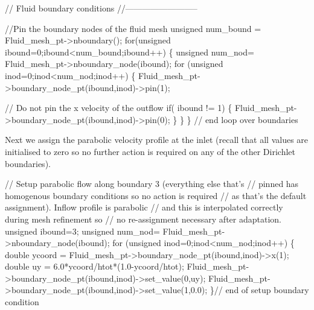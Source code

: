 \begin{DoxyCodeInclude}



 \textcolor{comment}{// Fluid boundary conditions}
 \textcolor{comment}{//--------------------------}

 \textcolor{comment}{//Pin the boundary nodes of the fluid mesh}
 \textcolor{keywordtype}{unsigned} num\_bound = Fluid\_mesh\_pt->nboundary();
 \textcolor{keywordflow}{for}(\textcolor{keywordtype}{unsigned} ibound=0;ibound<num\_bound;ibound++)
  \{
   \textcolor{keywordtype}{unsigned} num\_nod= Fluid\_mesh\_pt->nboundary\_node(ibound);
   \textcolor{keywordflow}{for} (\textcolor{keywordtype}{unsigned} inod=0;inod<num\_nod;inod++)
    \{
      Fluid\_mesh\_pt->boundary\_node\_pt(ibound,inod)->pin(1);
     
      \textcolor{comment}{// Do not pin the x velocity of the outflow}
      \textcolor{keywordflow}{if}( ibound != 1)
      \{
       Fluid\_mesh\_pt->boundary\_node\_pt(ibound,inod)->pin(0); 
      \}      
    \}
  \}
 \textcolor{comment}{// end loop over boundaries}

\end{DoxyCodeInclude}


Next we assign the parabolic velocity profile at the inlet (recall that all values are initialised to zero so no further action is required on any of the other Dirichlet boundaries).


\begin{DoxyCodeInclude}
   

 \textcolor{comment}{// Setup parabolic flow along boundary 3 (everything else that's }
 \textcolor{comment}{// pinned has homogenous boundary conditions so no action is required}
 \textcolor{comment}{// as that's the default assignment). Inflow profile is parabolic}
 \textcolor{comment}{// and this is interpolated correctly during mesh refinement so}
 \textcolor{comment}{// no re-assignment necessary after adaptation.}
 \textcolor{keywordtype}{unsigned} ibound=3; 
 \textcolor{keywordtype}{unsigned} num\_nod= Fluid\_mesh\_pt->nboundary\_node(ibound);
 \textcolor{keywordflow}{for} (\textcolor{keywordtype}{unsigned} inod=0;inod<num\_nod;inod++)
  \{
   \textcolor{keywordtype}{double} ycoord = Fluid\_mesh\_pt->boundary\_node\_pt(ibound,inod)->x(1); 
   \textcolor{keywordtype}{double} uy = 6.0*ycoord/htot*(1.0-ycoord/htot);
   Fluid\_mesh\_pt->boundary\_node\_pt(ibound,inod)->set\_value(0,uy);
   Fluid\_mesh\_pt->boundary\_node\_pt(ibound,inod)->set\_value(1,0.0);    
  \}\textcolor{comment}{// end of setup boundary condition}

\end{DoxyCodeInclude}



